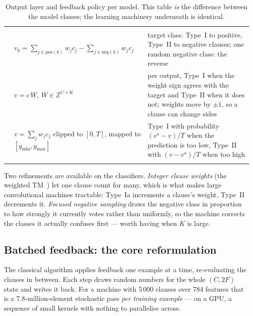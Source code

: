 \begin{table}[htbp]
\centering
\small\sffamily\sloppy
\caption{Output layer and feedback policy per model. This table \emph{is} the difference
  between the model classes; the learning machinery underneath is identical.}
\label{tab:policies}
\begin{tabularx}{\linewidth}{@{}L{3.5cm}L{4.15cm}>{\raggedright\arraybackslash}X@{}}
\ttoprule
{} &  & \\
\ttmidrule
{} &
  $v_k=\sum_{j\in\text{pos}(k)} w_jc_j-\sum_{j\in\text{neg}(k)} w_jc_j$ &
  target class: Type~I to positive, Type~II to negative clauses; one random negative class:
  the reverse\\
 &
  $v = c\,W$, $W\in\mathbb{Z}^{C\times K}$ &
  per output, Type~I when the weight sign agrees with the target and Type~II when it does
  not; weights move by $\pm1$, so a clause can change sides\\
 &
  $v=\sum_j w_jc_j$ clipped to $[0,T]$, mapped to $[y_{\min},y_{\max}]$ &
  Type~I with probability $(v^\star-v)/T$ when the prediction is too low, Type~II with
  $(v-v^\star)/T$ when too high\\
\ttbotrule
\end{tabularx}
\end{table}

Two refinements are available on the classifiers. \emph{Integer clause weights} (the weighted
TM~) let one clause count for many, which is what makes large convolutional
machines tractable: Type~Ia increments a clause's weight, Type~II decrements it.
\emph{Focused negative sampling} draws the negative class in proportion to how strongly it
currently votes rather than uniformly, so the machine corrects the classes it actually
confuses first --- worth having when $K$ is large.

\subsection{Batched feedback: the core reformulation}
\label{sec:batched}

The classical algorithm applies feedback one example at a time, re-evaluating the clauses in
between. Each step draws random numbers for the whole $(C, 2F)$ state and writes it back. For
a machine with 5\,000 clauses over 784 features that is a 7.8-million-element stochastic pass
\emph{per training example} --- on a GPU, a sequence of small kernels with nothing to
parallelise across.

